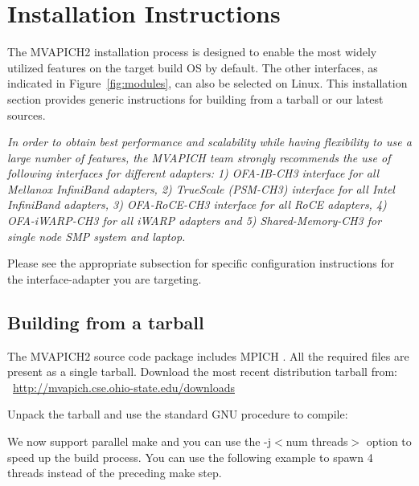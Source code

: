 \section{Installation Instructions}
\label{sec:install}

The MVAPICH2 installation process is designed to enable the most widely utilized
features on the target build OS by default. 
The other interfaces, as indicated in Figure~\ref{fig:modules}, can also be
selected on Linux.  This installation section provides generic instructions for
building from a tarball or our latest sources. 

{\em In order to obtain best performance and scalability while having
flexibility to use a large number of features, the MVAPICH team strongly
recommends the use of following interfaces for different adapters: 1) OFA-IB-CH3
interface for all Mellanox InfiniBand adapters, 2) TrueScale (PSM-CH3) interface for all
Intel InfiniBand adapters, 3) OFA-RoCE-CH3 interface for all RoCE adapters, 4)
OFA-iWARP-CH3 for all iWARP adapters and 5) Shared-Memory-CH3 for single node
SMP system and laptop.}

Please see the appropriate subsection for specific configuration 
instructions for the interface-adapter you are targeting. 

\subsection{Building from a tarball}
The MVAPICH2 \mvapichrcversion source code package includes MPICH
\mpichversion.  All the required files are present as a single tarball.
Download the most recent distribution tarball from:\\
~\href{http://mvapich.cse.ohio-state.edu/downloads}{http://mvapich.cse.ohio-state.edu/downloads}

Unpack the tarball and use the standard GNU procedure to compile:


We now support parallel make and you can use the -j$<$num threads$>$ option to
speed up the build process.  You can use the following example to 
spawn 4 threads instead of the preceding make step.

